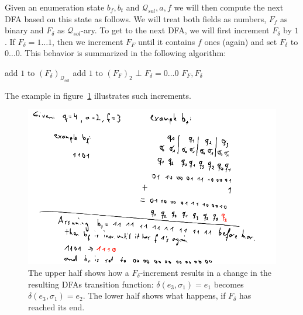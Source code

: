 Given an enumeration state $b_f, b_t$ and $\mathcal{Q}_{sol}, a, f$ we will then compute the next DFA based on this state as follows. We will treat both fields as numbers, $F_f$ as binary and $F_\delta$ as $\mathcal{Q}_{sol}$-ary. To get to the next DFA, we will first increment $F_\delta$ by $1$. If $F_\delta = 1 \ldots 1$, then we increment $F_F$ until it contains $f$ ones (again) and set $F_\delta$ to $0 \ldots 0$. This behavior is summarized in the following algorithm: 
\vspace{0.2cm}
\begin{algorithmic}[1]
	\State add $1$ to $(F_\delta)_{\mathcal{Q}_{sol}}$
		 
			\State add $1$ to $(F_F)_2$
				\State \Return $\bot$
			\EndIf
		\State $F_\delta = 0 \ldots 0$
		\EndWhile
	\EndIf
	\State \Return $F_F, F_\delta$
	\EndFunction
\end{algorithmic}
\vspace{0.2cm}
The example in figure~\ref{fig:dfa_enum_incr} illustrates such increments.


\begin{figure}
	\includegraphics[width=\linewidth]{images/dfa_enum_incr.png}
	\caption{The upper half shows how a $F_\delta$-increment results in a change in the resulting DFAs transition function: $\delta(e_3, \sigma_1) = e_1$ becomes $\delta(e_3, \sigma_1) = e_2$. The lower half shows what happens, if $F_\delta$ has reached its end.}
	\label{fig:dfa_enum_incr}
\end{figure}

